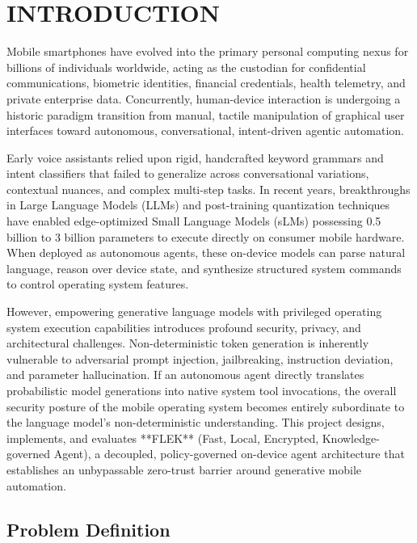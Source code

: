 \chapter{INTRODUCTION}

Mobile smartphones have evolved into the primary personal computing nexus for billions of individuals worldwide, acting as the custodian for confidential communications, biometric identities, financial credentials, health telemetry, and private enterprise data. Concurrently, human-device interaction is undergoing a historic paradigm transition from manual, tactile manipulation of graphical user interfaces toward autonomous, conversational, intent-driven agentic automation. 

Early voice assistants relied upon rigid, handcrafted keyword grammars and intent classifiers that failed to generalize across conversational variations, contextual nuances, and complex multi-step tasks. In recent years, breakthroughs in Large Language Models (LLMs) and post-training quantization techniques have enabled edge-optimized Small Language Models (sLMs) possessing 0.5 billion to 3 billion parameters to execute directly on consumer mobile hardware. When deployed as autonomous agents, these on-device models can parse natural language, reason over device state, and synthesize structured system commands to control operating system features.

However, empowering generative language models with privileged operating system execution capabilities introduces profound security, privacy, and architectural challenges. Non-deterministic token generation is inherently vulnerable to adversarial prompt injection, jailbreaking, instruction deviation, and parameter hallucination. If an autonomous agent directly translates probabilistic model generations into native system tool invocations, the overall security posture of the mobile operating system becomes entirely subordinate to the language model's non-deterministic understanding. This project designs, implements, and evaluates **FLEK** (Fast, Local, Encrypted, Knowledge-governed Agent), a decoupled, policy-governed on-device agent architecture that establishes an unbypassable zero-trust barrier around generative mobile automation.

\section{Problem Definition}

